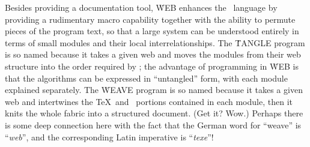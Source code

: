 Besides providing a documentation tool, \.{WEB} enhances the \PASCAL\
language by providing a rudimentary macro capability together with the
ability to permute pieces of the program text, so that a large system can
be understood entirely in terms of small modules and their local
interrelationships.  The \.{TANGLE} program is so named because it takes a
given web and moves the modules from their web structure into the order
required by \PASCAL; the advantage of programming in \.{WEB} is that the
algorithms can be expressed in ``untangled'' form, with each module
explained separately.  The \.{WEAVE} program is so named because it takes
a given web and intertwines the \TeX\ and \PASCAL\ portions contained in
each module, then it knits the whole fabric into a structured document.
(Get it? Wow.)  Perhaps there is some deep connection here with the fact
that the German word for ``weave'' is ``{\it web\/}'', and the
corresponding Latin imperative is ``{\it texe\/}''!

